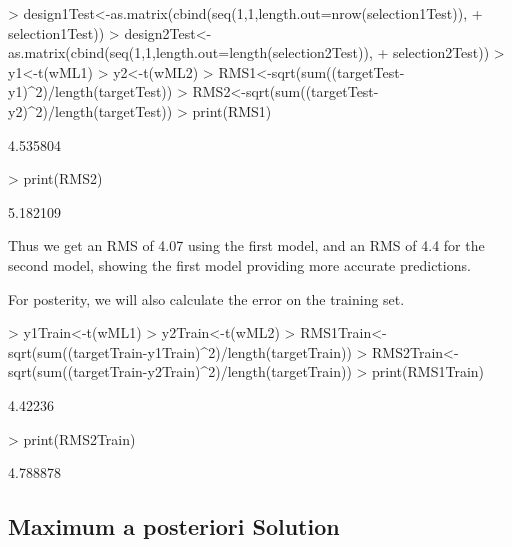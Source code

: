 \documentclass[nogin, 10pt]{article}
\begin{document}
\begin{Schunk}
\begin{Sinput}
> design1Test<-as.matrix(cbind(seq(1,1,length.out=nrow(selection1Test)),
+                          selection1Test))
> design2Test<-as.matrix(cbind(seq(1,1,length.out=length(selection2Test)),
+                          selection2Test))
> y1<-t(wML1)%*%t(design1Test)
> y2<-t(wML2)%*%t(design2Test)
> RMS1<-sqrt(sum((targetTest-y1)^2)/length(targetTest))
> RMS2<-sqrt(sum((targetTest-y2)^2)/length(targetTest))
> print(RMS1)
\end{Sinput}
\begin{Soutput}
[1] 4.535804
\end{Soutput}
\begin{Sinput}
> print(RMS2)
\end{Sinput}
\begin{Soutput}
[1] 5.182109
\end{Soutput}
\end{Schunk}
Thus we get an RMS of 4.07 using the first model, and an RMS of 4.4 for the second model, showing the first model providing more accurate predictions. 

For posterity, we will also calculate the error on the training set.
\begin{Schunk}
\begin{Sinput}
> y1Train<-t(wML1)%*%t(design1Train)
> y2Train<-t(wML2)%*%t(design2Train)
> RMS1Train<-sqrt(sum((targetTrain-y1Train)^2)/length(targetTrain))
> RMS2Train<-sqrt(sum((targetTrain-y2Train)^2)/length(targetTrain))
> print(RMS1Train)
\end{Sinput}
\begin{Soutput}
[1] 4.42236
\end{Soutput}
\begin{Sinput}
> print(RMS2Train)
\end{Sinput}
\begin{Soutput}
[1] 4.788878
\end{Soutput}
\end{Schunk}
\subsection{Maximum a posteriori Solution}
\end{document}
